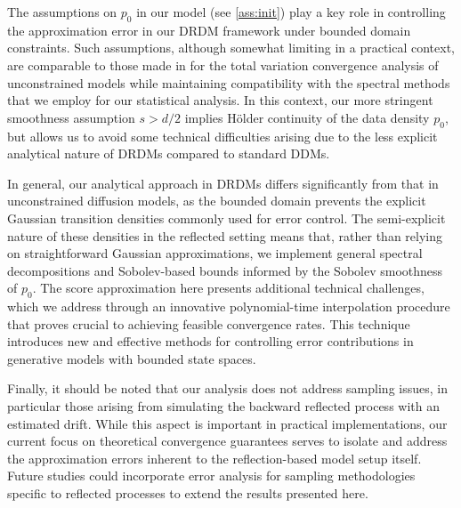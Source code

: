 \documentclass[a4paper, 11pt, headings = small, abstract]{scrartcl}
\begin{document}
The assumptions on $p_0$ in our model (see \ref{ass:init}) play a key role in controlling the approximation error in our DRDM framework under bounded domain constraints. Such assumptions, although somewhat limiting in a practical context, are comparable to those made in \cite{oko23} for the total variation convergence analysis of unconstrained models while maintaining compatibility with the spectral methods that we employ for our statistical analysis. In this context, our more stringent smoothness assumption $s > d/2$ implies Hölder continuity of the data density $p_0$, but allows us to avoid some technical difficulties arising due to the less explicit analytical nature of DRDMs compared to standard DDMs. 

In general, our analytical approach in DRDMs differs significantly from that in unconstrained diffusion models, as the bounded domain prevents the explicit Gaussian transition densities commonly used for error control. The semi-explicit nature of these densities in the reflected setting means that, rather than relying on straightforward Gaussian approximations, we implement general spectral decompositions and Sobolev-based bounds informed by the Sobolev smoothness of $p_0$. The score approximation here presents additional technical challenges, which we address through an innovative polynomial-time interpolation procedure that proves crucial to achieving feasible convergence rates. This technique introduces new and effective methods for controlling error contributions in generative models with bounded state spaces.

Finally, it should be noted that our analysis does not address sampling issues, in particular those arising from simulating the backward reflected process with an estimated drift. While this aspect is important in practical implementations, our current focus on theoretical convergence guarantees serves to isolate and address the approximation errors inherent to the reflection-based model setup itself. Future studies could incorporate error analysis for sampling methodologies specific to reflected processes to extend the results presented here.


\appendix 
\end{document}
